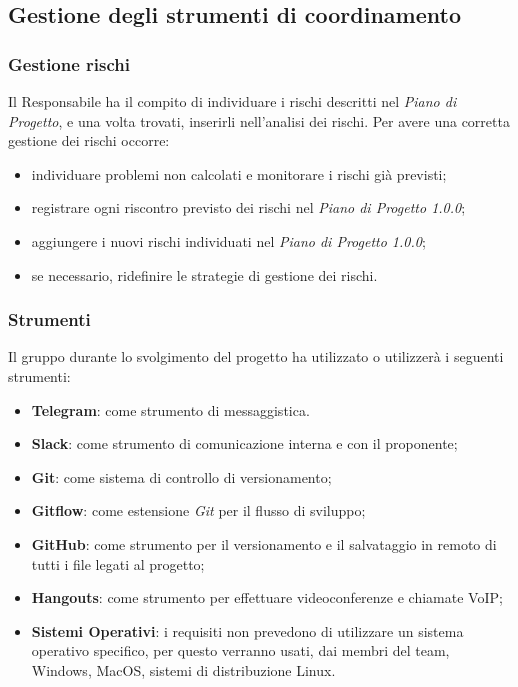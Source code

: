   	\subsection{Gestione degli strumenti di coordinamento}
  
   		\subsubsection{Gestione rischi}
   		Il Responsabile ha il compito di individuare i rischi descritti nel \textit{Piano di Progetto\docs}, e una volta trovati, inserirli nell'analisi dei rischi. Per avere una corretta gestione dei rischi occorre:
   		\begin{itemize}
   			\item individuare problemi non calcolati e monitorare i rischi già previsti;
   			\item registrare ogni riscontro previsto dei rischi nel \textit{Piano di Progetto 1.0.0\docs};
   			\item aggiungere i nuovi rischi individuati nel \textit{Piano di Progetto 1.0.0\docs};
   			\item se necessario, ridefinire le strategie di gestione dei rischi.
   		\end{itemize}  			
   			
   		\subsubsection{Strumenti}
   			Il gruppo durante lo svolgimento del progetto ha utilizzato o utilizzerà i seguenti strumenti:
   			\begin{itemize}
   				\item \textbf{Telegram}: come strumento di messaggistica.
   				\item \textbf{Slack\glos}: come strumento di comunicazione interna e con il proponente;
   				\item \textbf{Git\glos}: come sistema di controllo di versionamento;
   				\item \textbf{Gitflow\glos}: come estensione \textit{Git\glo} per il flusso di sviluppo;
   				\item \textbf{GitHub\glos}: come strumento per il versionamento e il salvataggio in remoto di tutti i file legati al progetto;
   				\item \textbf{Hangouts\glos}: come strumento per effettuare videoconferenze e chiamate VoIP;
   				\item \textbf{Sistemi Operativi}: i requisiti non prevedono di utilizzare un sistema operativo specifico, per questo verranno usati, dai membri del team, Windows, MacOS, sistemi di distribuzione Linux.
   			\end{itemize}
